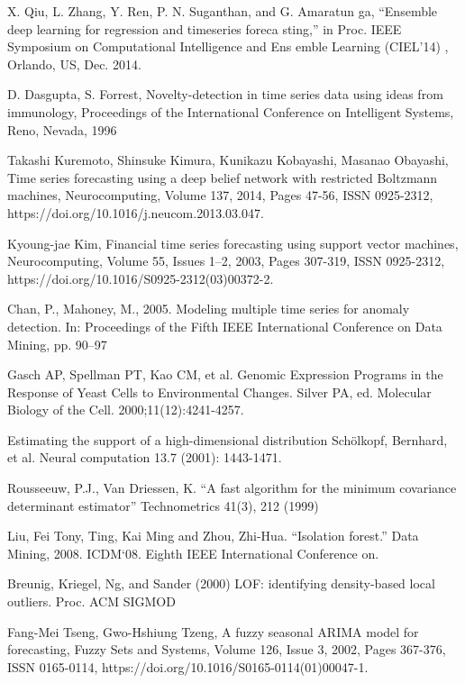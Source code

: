 \begin{thebibliography}{19}
 X. Qiu, L. Zhang, Y. Ren, P. N. Suganthan, and G. Amaratun
ga,
“Ensemble deep learning for regression and timeseries foreca
sting,” in
Proc. IEEE Symposium on Computational Intelligence and Ens
emble
Learning (CIEL’14)
, Orlando, US, Dec. 2014.

 D. Dasgupta, S. Forrest, Novelty-detection in time series
data using ideas from immunology, Proceedings of the
International  Conference  on  Intelligent  Systems,  Reno,
Nevada, 1996

 Takashi Kuremoto, Shinsuke Kimura, Kunikazu Kobayashi, Masanao Obayashi,
Time series forecasting using a deep belief network with restricted Boltzmann machines,
Neurocomputing,
Volume 137,
2014,
Pages 47-56,
ISSN 0925-2312,
https://doi.org/10.1016/j.neucom.2013.03.047.

 Kyoung-jae Kim,
Financial time series forecasting using support vector machines,
Neurocomputing,
Volume 55, Issues 1–2,
2003,
Pages 307-319,
ISSN 0925-2312,
https://doi.org/10.1016/S0925-2312(03)00372-2.

 Chan, P., Mahoney, M., 2005. Modeling multiple time series for anomaly detection.
In: Proceedings of the Fifth IEEE International Conference on Data Mining,
pp. 90–97

Gasch AP, Spellman PT, Kao CM, et al. Genomic Expression Programs in the Response of Yeast Cells to Environmental Changes. Silver PA, ed. Molecular Biology of the Cell. 2000;11(12):4241-4257.

 Estimating the support of a high-dimensional distribution Schölkopf, Bernhard, et al. Neural computation 13.7 (2001): 1443-1471.

 Rousseeuw, P.J., Van Driessen, K. “A fast algorithm for the minimum covariance determinant estimator” Technometrics 41(3), 212 (1999)

 Liu, Fei Tony, Ting, Kai Ming and Zhou, Zhi-Hua. “Isolation forest.” Data Mining, 2008. ICDM‘08. Eighth IEEE International Conference on.

 Breunig, Kriegel, Ng, and Sander (2000) LOF: identifying density-based local outliers. Proc. ACM SIGMOD

 Fang-Mei Tseng, Gwo-Hshiung Tzeng,
A fuzzy seasonal ARIMA model for forecasting,
Fuzzy Sets and Systems,
Volume 126, Issue 3,
2002,
Pages 367-376,
ISSN 0165-0114,
https://doi.org/10.1016/S0165-0114(01)00047-1.


\end{thebibliography}
